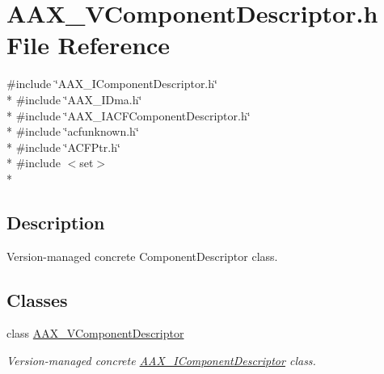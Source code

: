 \hypertarget{a00303}{}\section{A\+A\+X\+\_\+\+V\+Component\+Descriptor.\+h File Reference}
\label{a00303}
{\ttfamily \#include \char`\"{}A\+A\+X\+\_\+\+I\+Component\+Descriptor.\+h\char`\"{}}\\*
{\ttfamily \#include \char`\"{}A\+A\+X\+\_\+\+I\+Dma.\+h\char`\"{}}\\*
{\ttfamily \#include \char`\"{}A\+A\+X\+\_\+\+I\+A\+C\+F\+Component\+Descriptor.\+h\char`\"{}}\\*
{\ttfamily \#include \char`\"{}acfunknown.\+h\char`\"{}}\\*
{\ttfamily \#include \char`\"{}A\+C\+F\+Ptr.\+h\char`\"{}}\\*
{\ttfamily \#include $<$set$>$}\\*


\subsection{Description}
Version-\/managed concrete Component\+Descriptor class. 

\subsection*{Classes}
\begin{DoxyCompactItemize}
\item 
class \hyperlink{a00131}{A\+A\+X\+\_\+\+V\+Component\+Descriptor}
\begin{DoxyCompactList}\small\item\em Version-\/managed concrete \hyperlink{a00088}{A\+A\+X\+\_\+\+I\+Component\+Descriptor} class. \end{DoxyCompactList}\end{DoxyCompactItemize}
